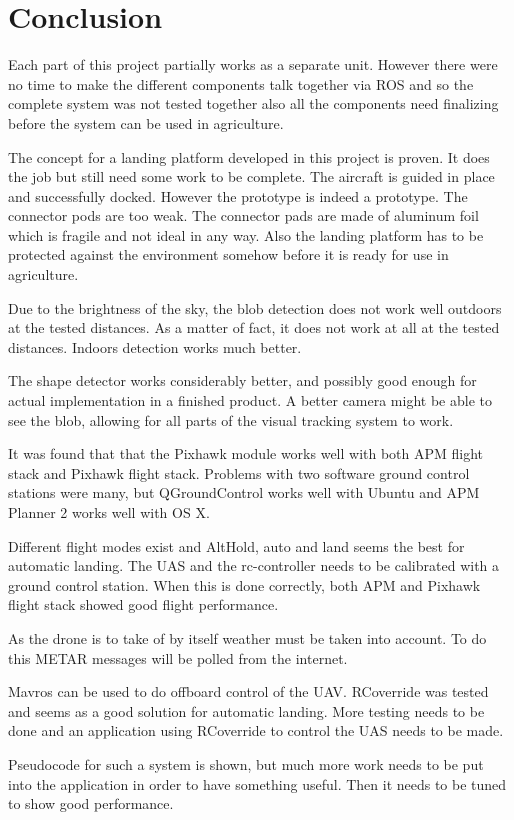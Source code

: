\section{Conclusion}
Each part of this project partially works as a separate unit. However there were no time to make the different components talk together via ROS and so the complete system was not tested together also all the components need finalizing before the system can be used in agriculture.

The concept for a landing platform developed in this project is proven. It does the job but still need some work to be complete. The aircraft is guided in place and successfully docked. However the prototype is indeed a prototype. The connector pods are too weak. The connector pads are made of aluminum foil which is fragile and not ideal in any way. Also the landing platform has to be protected against the environment somehow before it is ready for use in agriculture. 

Due to the brightness of the sky, the blob detection does not work well outdoors at the tested distances. As a matter of fact, it does not work at all at the tested distances. Indoors detection works much better. 

The shape detector works considerably better, and possibly good enough for actual implementation in a finished product. A better camera might be able to see the blob, allowing for all parts of the visual tracking system to work.

It was found that that the Pixhawk module works well with both APM flight stack and Pixhawk flight stack. Problems with two software ground control stations were many, but QGroundControl works well with Ubuntu and APM Planner 2 works well with OS X.

Different flight modes exist and AltHold, auto and land seems the best for automatic landing. The UAS and the rc-controller needs to be calibrated with a ground control station. When this is done correctly, both APM and Pixhawk flight stack showed good flight performance.

As the drone is to take of by itself weather must be taken into account. To do this METAR messages will be polled from the internet. 

Mavros can be used to do offboard control of the UAV. RCoverride was tested and seems as a good solution for automatic landing. More testing needs to be done and an application using RCoverride to control the UAS needs to be made.
 
Pseudocode for such a system is shown, but much more work needs to be put into the application in order to have something useful. Then it needs to be tuned to show good performance.